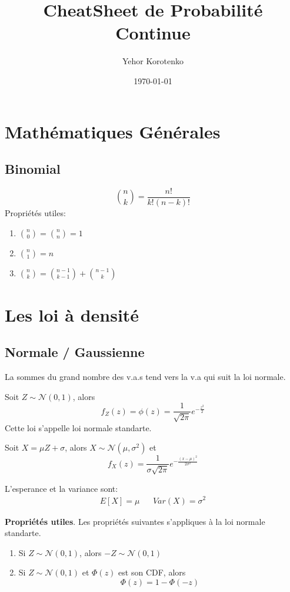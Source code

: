 \documentclass[a4paper]{article}
\title{CheatSheet de Probabilité Continue}
\author{Yehor Korotenko}
\date{\today}
\begin{document}
\maketitle
\section{Mathématiques Générales} 
\subsection{Binomial}
\[
    \binom{n}{k} = \frac{n!}{k!(n-k)!}
\] 
Propriétés utiles:
\begin{enumerate}
    \item $\binom{n}{0} = \binom{n}{n} = 1$
    \item $\binom{n}{1} = n$ 
    \item $\binom{n}{k} = \binom{n-1}{k-1} + \binom{n-1}{k}$
\end{enumerate}

\section{Les loi à densité}%
\label{sec:Les loi à densité}
\subsection{Normale / Gaussienne}
La sommes du grand nombre des v.a.s tend vers la v.a qui suit la loi normale.

Soit $Z \sim \mathcal{N}(0, 1)$, alors
 \[
     f_Z(z) = \phi(z) = \frac{1}{\sqrt{2 \pi} }e^{-\frac{z^2}{2}}
\] 
Cette loi s'appelle loi normale standarte.

Soit $X = \mu Z + \sigma$, alors  $X \sim \mathcal{N}(\mu, \sigma^2)$ et 
 \[
     f_X(z) = \frac{1}{\sigma \sqrt{2 \pi} }e^{- \frac{(x - \mu)^2}{2\sigma^2}}
\] 

L'esperance et la variance sont:
\begin{align*}
    E[X] = \mu & & Var(X) = \sigma^2
\end{align*}

\textbf{Propriétés utiles}.
Les propriétés suivantes s'appliques à la loi normale standarte.
\begin{enumerate}
    \item Si $Z \sim \mathcal{N}(0, 1)$, alors  $-Z \sim \mathcal{N}(0, 1)$ 
    \item Si $Z \sim \mathcal{N}(0, 1)$ et  $\Phi(z)$ est son CDF, alors
         \[
        \Phi(z) = 1 - \Phi(-z)
        \] 
\end{enumerate}
\end{document}
